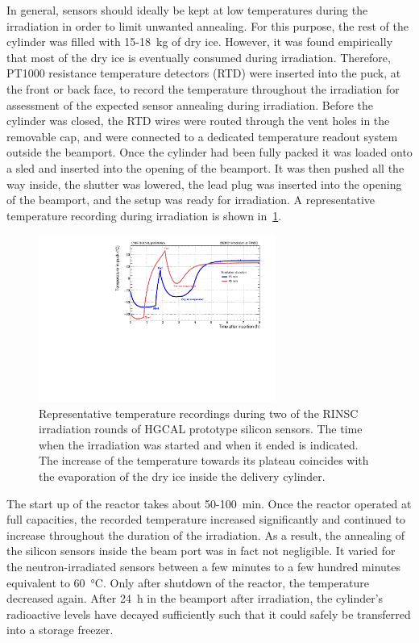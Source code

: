 In general, sensors should ideally be kept at low temperatures during the irradiation in order to limit unwanted annealing.
For this purpose, the rest of the cylinder was filled with 15-\SI{18}{\kilo\gram} of dry ice.
However, it was found empirically that most of the dry ice is eventually consumed during irradiation.
Therefore, PT1000 resistance temperature detectors (RTD) were inserted into the puck, at the front or back face, to record the temperature throughout the irradiation for assessment of the expected sensor annealing during irradiation.
Before the cylinder was closed, the RTD wires were routed through the vent holes in the removable cap, and were connected to a dedicated temperature readout system outside the beamport.\newline 
Once the cylinder had been fully packed it was loaded onto a sled and inserted into the opening of the beamport.
It was then pushed all the way inside, the shutter was lowered, the lead plug was inserted into the opening of the beamport, and the setup was ready for irradiation.\newline
A representative temperature recording during irradiation is shown in~\ref{fig:Round_10_Temperature_Profile}.
\begin{figure}[!hbt]
  \begin{center}
    \includegraphics[width=0.69\textwidth]{plots/RINSC_temp/RINSC_temp.pdf}
    \caption{Representative temperature recordings during two of the RINSC irradiation rounds of HGCAL prototype silicon sensors. 
    The time when the irradiation was started and when it ended is indicated.
    The increase of the temperature towards its plateau coincides with the evaporation of the dry ice inside the delivery cylinder.
    }
    \label{fig:Round_10_Temperature_Profile}
  \end{center}
\end{figure}
The start up of the reactor takes about 50-\SI{100}{\minute}. 
Once the reactor operated at full capacities, the recorded temperature increased significantly and continued to increase throughout the duration of the irradiation.
As a result, the annealing of the silicon sensors inside the beam port was in fact not negligible.
It varied for the neutron-irradiated sensors between a few minutes to a few hundred minutes equivalent to \SI{60}{\celsius}.
Only after shutdown of the reactor, the temperature decreased again.
After \SI{24}{\hour} in the beamport after irradiation, the cylinder's radioactive levels have decayed sufficiently such that it could safely be transferred into a storage freezer.

